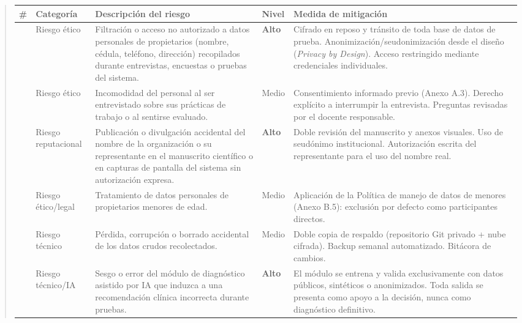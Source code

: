 \documentclass[
]{article}
\newcounter{none} %
\begin{document}
\begin{quote}
{\def\LTcaptype{none} %
\begin{longtable}[]{|
  >{\raggedright\arraybackslash}p{}|
  >{\raggedright\arraybackslash}p{}|
  >{\raggedright\arraybackslash}p{}|
  >{\centering\arraybackslash}p{}|
  >{\raggedright\arraybackslash}p{}|}
\hline
\textbf{\#} & \textbf{Categoría} & \textbf{Descripción del riesgo} & \textbf{Nivel} & \textbf{Medida de mitigación} \\
\hline
\endhead
\hline
\endlastfoot
1 & Riesgo ético & Filtración o acceso no autorizado a datos personales de propietarios (nombre, cédula, teléfono, dirección) recopilados durante entrevistas, encuestas o pruebas del sistema. & \textbf{Alto} & Cifrado en reposo y tránsito de toda base de datos de prueba. Anonimización/seudonimización desde el diseño (\emph{Privacy by Design}). Acceso restringido mediante credenciales individuales. \\
\hline
2 & Riesgo ético & Incomodidad del personal al ser entrevistado sobre sus prácticas de trabajo o al sentirse evaluado. & Medio & Consentimiento informado previo (Anexo A.3). Derecho explícito a interrumpir la entrevista. Preguntas revisadas por el docente responsable. \\
\hline
3 & Riesgo reputacional & Publicación o divulgación accidental del nombre de la organización o su representante en el manuscrito científico o en capturas de pantalla del sistema sin autorización expresa. & \textbf{Alto} & Doble revisión del manuscrito y anexos visuales. Uso de seudónimo institucional. Autorización escrita del representante para el uso del nombre real. \\
\hline
4 & Riesgo ético/legal & Tratamiento de datos personales de propietarios menores de edad. & Medio & Aplicación de la Política de manejo de datos de menores (Anexo B.5): exclusión por defecto como participantes directos. \\
\hline
5 & Riesgo técnico & Pérdida, corrupción o borrado accidental de los datos crudos recolectados. & Medio & Doble copia de respaldo (repositorio Git privado + nube cifrada). Backup semanal automatizado. Bitácora de cambios. \\
\hline
6 & Riesgo técnico/IA & Sesgo o error del módulo de diagnóstico asistido por IA que induzca a una recomendación clínica incorrecta durante pruebas. & \textbf{Alto} & El módulo se entrena y valida exclusivamente con datos públicos, sintéticos o anonimizados. Toda salida se presenta como apoyo a la decisión, nunca como diagnóstico definitivo. \\

\end{longtable}}
\end{quote}
\end{document}
